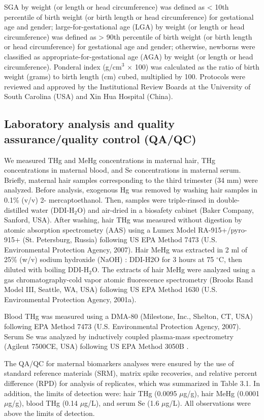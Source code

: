 SGA by weight (or length or head circumference) was defined as < 10th percentile of birth weight (or birth length or head circumference) for gestational age and gender; large-for-gestational age (LGA) by weight (or length or head circumference) was defined as > 90th percentile of birth weight (or birth length or head circumference) for gestational age and gender; otherwise, newborns were classified as appropriate-for-gestational age (AGA) by weight (or length or head circumference). Ponderal index (g/cm$^{3}$ \({\times}\) 100) was calculated as the ratio of birth weight (grams) to birth length (cm) cubed, multiplied by 100. Protocols were reviewed and approved by the Institutional Review Boards at the University of South Carolina (USA) and Xin Hua Hospital (China).

\subsection{Laboratory analysis and quality assurance/quality control (QA/QC)}

We measured THg and MeHg concentrations in maternal hair, THg concentrations in maternal blood, and Se concentrations in maternal serum. Briefly, maternal hair samples corresponding to the third trimester (34 mm) were analyzed. Before analysis, exogenous Hg was removed by washing hair samples in 0.1\% (v/v) 2- mercaptoethanol. Then, samples were triple-rinsed in double-distilled water (DDI-H${_2}$O) and air-dried in a biosafety cabinet (Baker Company, Sanford, USA). After washing, hair THg was measured without digestion by atomic absorption spectrometry (AAS) using a Lumex Model RA-915+/pyro-915+ (St. Petersburg, Russia) following US EPA Method 7473 (U.S. Environmental Protection Agency, 2007). Hair MeHg was extracted in 2 ml of 25\% (w/v) sodium hydroxide (NaOH) : DDI-H2O for 3 hours at 75 \({^\circ}\)C, then diluted with boiling DDI-H${_2}$O. The extracts of hair MeHg were analyzed using a gas chromatography-cold vapor atomic fluorescence spectrometry (Brooks Rand Model III, Seattle, WA, USA) following US EPA Method 1630 (U.S. Environmental Protection Agency, 2001a).

Blood THg was measured using a DMA-80 (Milestone, Inc., Shelton, CT, USA) following EPA Method 7473 (U.S. Environmental Protection Agency, 2007). Serum Se was analyzed by inductively coupled plasma-mass spectrometry (Agilent 7500CE, USA) following US EPA Method 3050B \citep{usepa19963050}.

The QA/QC for maternal biomarkers analyses were ensured by the use of standard reference materials (SRM), matrix spike recoveries, and relative percent difference (RPD) for analysis of replicates, which was summarized in Table 3.1. In addition, the limits of detection were: hair THg (0.0095 ${\mu}$g/g), hair MeHg (0.0001 ${\mu}$g/g), blood THg (0.14 ${\mu}$g/L), and serum Se (1.6 ${\mu}$g/L). All observations were above the limits of detection.

